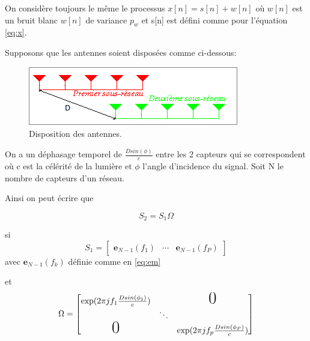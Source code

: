 \documentclass{article}
\begin{document}
\vspace*{10pt}

On considère toujours le même le processus \(x[n] = s[n] + w[n]\) où \(w[n]\) est un bruit blanc \(w[n]\) de variance \(p_w\) et s[n] est défini comme pour l'équation \ref{eq:x}.

Supposons que les antennes soient disposées comme ci-dessous:

\begin{figure}[h]
\centering
\includegraphics[scale=.8]{images/ReseauEsprit}
\caption{Disposition des antennes.}
\end{figure}

On a un déphasage temporel de \( \frac{D sin(\phi) }{c}  \) entre les 2 capteurs qui se correspondent où c est la célérité de la lumière et \(\phi\) l'angle d'incidence du signal. Soit N le nombre de capteurs d'un réseau. 


Ainsi on peut écrire que 

\begin{equation}
S_2 = S_1 \Omega
\end{equation}

\vspace*{20pt}

si \[ S_1 = \begin{bmatrix}
        \boldsymbol{e}_{N-1}(f_1) & \cdots & \boldsymbol{e}_{N-1}(f_P)
    \end{bmatrix} \] avec \( \boldsymbol{e}_{N-1}(f_k) \) définie comme en \ref{eq:em}
    


    
\vspace*{20pt}

et \[ \Omega = \begin{bmatrix}
         \exp(2\pi j f_1 \frac{D sin(\phi_1) }{c}) & & \text{\huge0}\\
         &  \ddots \\
         \text{\huge0} & & \exp(2\pi j f_p \frac{D sin(\phi_P) }{c})\\

         \end{bmatrix} \]
        
\vspace*{20pt}
         
\end{document}
